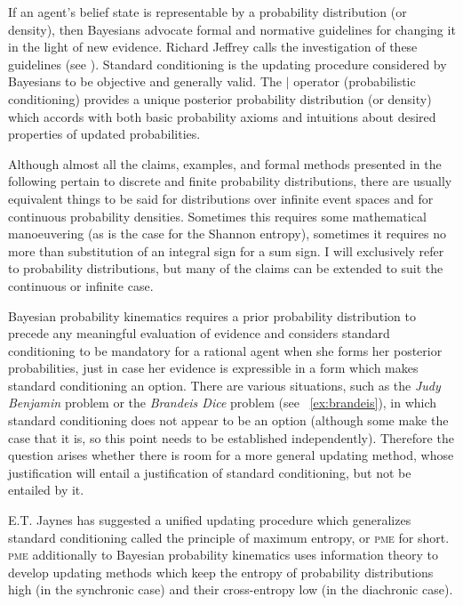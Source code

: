 \documentclass[phd,12pt,oneside]{ubcthesis}
\begin{document}
If an agent's belief state is representable by a probability
distribution (or density), then Bayesians advocate formal and
normative guidelines for changing it in the light of new evidence.
Richard Jeffrey calls the investigation of these guidelines
 (see ). Standard
conditioning is the updating procedure considered by Bayesians to be
objective and generally valid. The $\mid$ operator (probabilistic
conditioning) provides a unique posterior probability distribution (or
density) which accords with both basic probability axioms and
intuitions about desired properties of updated probabilities.

Although almost all the claims, examples, and formal methods presented
in the following pertain to discrete and finite probability
distributions, there are usually equivalent things to be said for
distributions over infinite event spaces and for continuous
probability densities. Sometimes this requires some mathematical
manoeuvering (as is the case for the Shannon entropy), sometimes it
requires no more than substitution of an integral sign for a sum sign.
I will exclusively refer to probability distributions, but many of the
claims can be extended to suit the continuous or infinite case.

Bayesian probability kinematics requires a prior probability
distribution to precede any meaningful evaluation of evidence and
considers standard conditioning to be mandatory for a rational agent
when she forms her posterior probabilities, just in case her evidence
is expressible in a form which makes standard conditioning an option.
There are various situations, such as the \emph{Judy Benjamin} problem
or the \emph{Brandeis Dice} problem (see {\xample}~\ref{ex:brandeis}),
in which standard conditioning does not appear to be an option
(although some make the case that it is, so this point needs to be
established independently). Therefore the question arises whether
there is room for a more general updating method, whose justification
will entail a justification of standard conditioning, but not be
entailed by it.

E.T. Jaynes has suggested a unified updating procedure which
generalizes standard conditioning called the principle of maximum
entropy, or \textsc{pme} for short. \textsc{pme} additionally to
Bayesian probability kinematics uses information theory to develop
updating methods which keep the entropy of probability distributions
high (in the synchronic case) and their cross-entropy low (in the
diachronic case). 
\end{document}

